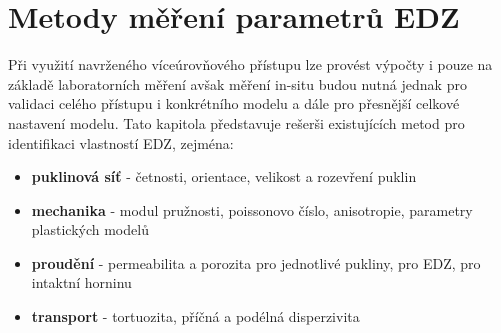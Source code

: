 \documentclass{article}
\begin{document}
% 
% 
% 
% 
% 
% 
% 
% 


\section{Metody měření parametrů EDZ}
\label{sec:parameters}

Při využití navrženého víceúrovňového přístupu lze provést výpočty i pouze na základě laboratorních měření avšak měření in-situ budou
nutná jednak pro validaci celého přístupu i konkrétního modelu a dále pro přesnější celkové nastavení modelu. Tato kapitola představuje
rešerši existujících metod pro identifikaci vlastností EDZ, zejména: 

\begin{itemize}
 \item {\bf puklinová síť} - četnosti, orientace, velikost a rozevření puklin
 \item {\bf mechanika} - modul pružnosti, poissonovo číslo, anisotropie, parametry plastických modelů
 \item {\bf proudění} - permeabilita a porozita pro jednotlivé pukliny, pro EDZ, pro intaktní horninu
 \item {\bf transport} - tortuozita, příčná a podélná disperzivita
\end{itemize}
\end{document}
